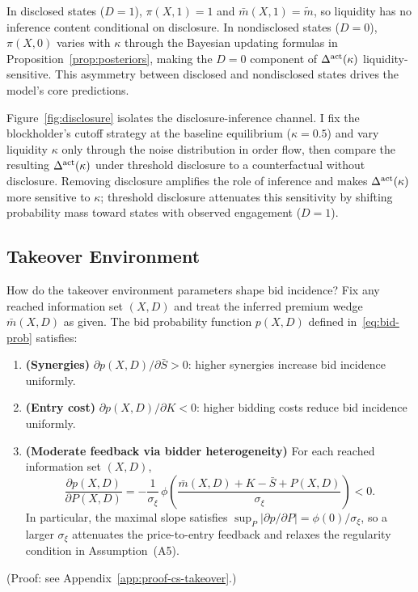 \documentclass[11pt]{article}
\newcommand{\1}{\mathbf{1}}
\begin{document}
In disclosed states ($D=1$), $\pi(X,1)=1$ and $\bar{m}(X,1)=\tilde{m}$, so liquidity has no inference content conditional on disclosure. In nondisclosed states ($D=0$), $\pi(X,0)$ varies with $\kappa$ through the Bayesian updating formulas in Proposition~\ref{prop:posteriors}, making the $D=0$ component of $\Delta^{\textup{act}}(\kappa)$ liquidity-sensitive. This asymmetry between disclosed and nondisclosed states drives the model's core predictions.

Figure~\ref{fig:disclosure} isolates the disclosure-inference channel. I fix the blockholder's cutoff strategy at the baseline equilibrium ($\kappa=0.5$) and vary liquidity $\kappa$ only through the noise distribution in order flow, then compare the resulting $\Delta^{\textup{act}}(\kappa)$ under threshold disclosure to a counterfactual without disclosure. Removing disclosure amplifies the role of inference and makes $\Delta^{\textup{act}}(\kappa)$ more sensitive to $\kappa$; threshold disclosure attenuates this sensitivity by shifting probability mass toward states with observed engagement ($D=1$).

%
\subsection{Takeover Environment}
%

How do the takeover environment parameters shape bid incidence? Fix any reached information set $(X,D)$ and treat the inferred premium wedge $\bar{m}(X,D)$ as given. The bid probability function $p(X,D)$ defined in~\eqref{eq:bid-prob} satisfies:
\begin{enumerate}[label=\textup{(\alph*)},leftmargin=2em]
\item \textbf{(Synergies)} $\partial p(X,D) / \partial \bar{S} > 0$: higher synergies increase bid incidence uniformly.
\item \textbf{(Entry cost)} $\partial p(X,D) / \partial K < 0$: higher bidding costs reduce bid incidence uniformly.
\item \textbf{(Moderate feedback via bidder heterogeneity)} For each reached information set $(X,D)$,
\[
\frac{\partial p(X,D)}{\partial P(X,D)}=-\frac{1}{\sigma_\xi}\,\phi\!\left(\frac{\bar{m}(X,D)+K-\bar{S}+P(X,D)}{\sigma_\xi}\right)<0.
\]
In particular, the maximal slope satisfies $\sup_{P}\bigl|\partial p/\partial P\bigr|=\phi(0)/\sigma_\xi$, so a larger $\sigma_\xi$ attenuates the price-to-entry feedback and relaxes the regularity condition in Assumption~\textup{(A5)}.
\end{enumerate}
(Proof: see Appendix~\ref{app:proof-cs-takeover}.)
\end{document}
